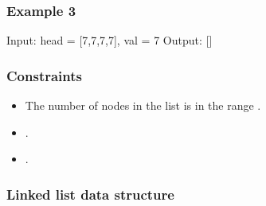 \documentclass[letterpaper,12pt,english]{book}
\begin{document}
\subsubsection{Example 3}
\label{\detokenize{Linked_List/02_LL_203_Remove_Linked_List_Elements:example-3}}
\begin{sphinxVerbatim}[commandchars=\\\{\}]
Input: head = [7,7,7,7], val = 7
Output: []
\end{sphinxVerbatim}


\subsubsection{Constraints}
\label{\detokenize{Linked_List/02_LL_203_Remove_Linked_List_Elements:constraints}}\begin{itemize}
\item {} 
\sphinxAtStartPar
The number of nodes in the list is in the range \sphinxcode{\sphinxupquote{{[}0, 10\textasciicircum{}4{]}}}.

\item {} 
\sphinxAtStartPar
{}.

\item {} 
\sphinxAtStartPar
{}.

\end{itemize}


\subsubsection{Linked list data structure}
\label{\detokenize{Linked_List/02_LL_203_Remove_Linked_List_Elements:linked-list-data-structure}}
\begin{sphinxVerbatim}[commandchars=\\\{\}]
\end{sphinxVerbatim}
\end{document}
